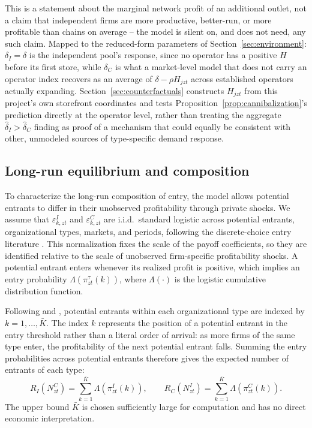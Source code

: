 \documentclass[english,12pt]{article}
\begin{document}
This is a statement about the marginal network profit of an additional outlet, not a claim that independent firms are more productive, better-run, or more profitable than chains on average -- the model is silent on, and does not need, any such claim. Mapped to the reduced-form parameters of Section~\ref{sec:environment}: $\delta_I=\delta$ is the independent pool's response, since no operator has a positive $H$ before its first store, while $\delta_C$ is what a market-level model that does not carry an operator index recovers as an average of $\delta-\rho H_{jzt}$ across established operators actually expanding. Section~\ref{sec:counterfactuals} constructs $H_{jzt}$ from this project's own storefront coordinates and tests Proposition~\ref{prop:cannibalization}'s prediction directly at the operator level, rather than treating the aggregate $\hat\delta_I>\hat\delta_C$ finding as proof of a mechanism that could equally be consistent with other, unmodeled sources of type-specific demand response.

\color{black}

\subsection{Long-run equilibrium and composition}
\label{sec:equilibrium}

To characterize the long-run composition of entry, the model allows potential entrants to differ in their unobserved profitability through private shocks. We assume that $\varepsilon^I_{k,zt}$ and $\varepsilon^C_{k,zt}$ are i.i.d.\ standard logistic across potential entrants, organizational types, markets, and periods, following the discrete-choice entry literature \citep{Seim2006,TrainDCM}. This normalization fixes the scale of the payoff coefficients, so they are identified relative to the scale of unobserved firm-specific profitability shocks. A potential entrant enters whenever its realized profit is positive, which implies an entry probability $\Lambda(\pi^\tau_{zt}(k))$, where $\Lambda(\cdot)$ is the logistic cumulative distribution function.

Following \citet{BresnahanReiss1991} and \citet{Mazzeo2002}, potential entrants within each organizational type are indexed by $k=1,\ldots,\bar K$. The index $k$ represents the position of a potential entrant in the entry threshold rather than a literal order of arrival: as more firms of the same type enter, the profitability of the next potential entrant falls. Summing the entry probabilities across potential entrants therefore gives the expected number of entrants of each type:
\begin{equation}
\label{eq:bestresponses}
R_I(N^C_{zt})
=
\sum_{k=1}^{\bar K}
\Lambda\!\left(\pi^I_{zt}(k)\right),
\qquad
R_C(N^I_{zt})
=
\sum_{k=1}^{\bar K}
\Lambda\!\left(\pi^C_{zt}(k)\right).
\end{equation}
The upper bound $\bar K$ is chosen sufficiently large for computation and has no direct economic interpretation.
\end{document}
